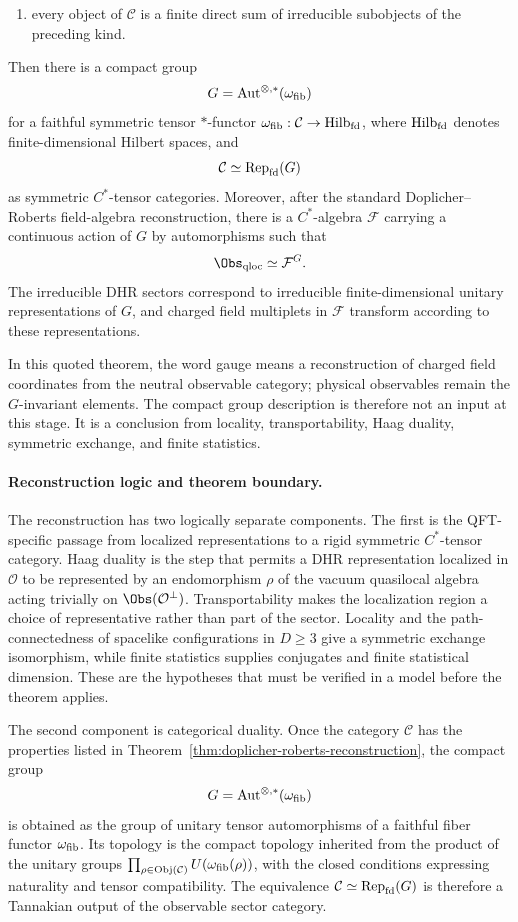\begin{quotedtheorem}
\begin{enumerate}[label=\textup{(\roman*)}]
\item every object of \(\mathcal C\) is a finite direct sum of irreducible
subobjects of the preceding kind.
\end{enumerate}
Then there is a compact group
\[
  G=\operatorname{Aut}^{\otimes,*}(\omega_{\rm fib})
\]
for a faithful symmetric tensor \(*\)-functor
\(\omega_{\rm fib}:\mathcal C\to{\rm Hilb}_{\rm fd}\), where
\({\rm Hilb}_{\rm fd}\) denotes finite-dimensional Hilbert spaces, and
\[
  \mathcal C\simeq {\rm Rep}_{\rm fd}(G)
\]
as symmetric \(C^*\)-tensor categories.  Moreover, after the standard
Doplicher--Roberts field-algebra reconstruction, there is a \(C^*\)-algebra
\(\mathcal F\) carrying a continuous action of \(G\) by automorphisms such that
\[
  \Obs_{\rm qloc}\simeq \mathcal F^G .
\]
The irreducible DHR sectors correspond to irreducible finite-dimensional
unitary representations of \(G\), and charged field multiplets in
\(\mathcal F\) transform according to these representations.
\end{quotedtheorem}

In this quoted theorem, the word gauge means a reconstruction of charged field
coordinates from the neutral observable category; physical observables remain
the \(G\)-invariant elements.  The compact group description is therefore not
an input at this stage.  It is a conclusion from locality, transportability,
Haag duality, symmetric exchange, and finite statistics.

\paragraph{Reconstruction logic and theorem boundary.}
The reconstruction has two logically separate components.  The first is the
QFT-specific passage from localized representations to a rigid symmetric
\(C^*\)-tensor category.  Haag duality is the step that permits a DHR
representation localized in \(\mathcal O\) to be represented by an
endomorphism \(\rho\) of the vacuum quasilocal algebra acting trivially on
\(\Obs(\mathcal O^\perp)\).  Transportability makes the localization region a
choice of representative rather than part of the sector.  Locality and the
path-connectedness of spacelike configurations in \(D\ge3\) give a symmetric
exchange isomorphism, while finite statistics supplies conjugates and finite
statistical dimension.  These are the hypotheses that must be verified in a
model before the theorem applies.

The second component is categorical duality.  Once the category
\(\mathcal C\) has the properties listed in
Theorem~\ref{thm:doplicher-roberts-reconstruction}, the compact group
\[
  G=\operatorname{Aut}^{\otimes,*}(\omega_{\rm fib})
\]
is obtained as the group of unitary tensor automorphisms of a faithful fiber
functor \(\omega_{\rm fib}\).  Its topology is the compact topology inherited
from the product of the unitary groups
\(\prod_{\rho\in{\rm Obj}(\mathcal C)}U(\omega_{\rm fib}(\rho))\), with the
closed conditions expressing naturality and tensor compatibility.  The
equivalence \(\mathcal C\simeq{\rm Rep}_{\rm fd}(G)\) is therefore a
Tannakian output of the observable sector category.

